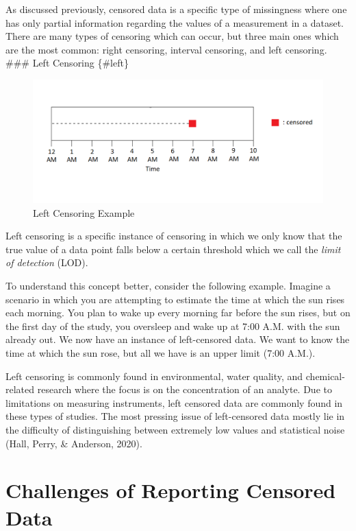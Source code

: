 \documentclass[12pt, twoside]{amherstthesis}
\begin{document}
As discussed previously, censored data is a specific type of missingness where one has only partial information regarding the values of a measurement in a dataset. There are many types of censoring which can occur, but three main ones which are the most common: right censoring, interval censoring, and left censoring.
\#\#\# Left Censoring \{\#left\}
\begin{figure}

{\centering \includegraphics[width=1\linewidth]{figures/left_censoring_example_fix} 

}

\caption{Left Censoring Example}\label{fig:leftcensoringexample}
\end{figure}
Left censoring is a specific instance of censoring in which we only know that the true value of a data point falls below a certain threshold which we call the \emph{limit of detection} (LOD).

To understand this concept better, consider the following example. Imagine a scenario in which you are attempting to estimate the time at which the sun rises each morning. You plan to wake up every morning far before the sun rises, but on the first day of the study, you oversleep and wake up at 7:00 A.M. with the sun already out. We now have an instance of left-censored data. We want to know the time at which the sun rose, but all we have is an upper limit (7:00 A.M.).

Left censoring is commonly found in environmental, water quality, and chemical-related research where the focus is on the concentration of an analyte. Due to limitations on measuring instruments, left censored data are commonly found in these types of studies. The most pressing issue of left-censored data mostly lie in the difficulty of distinguishing between extremely low values and statistical noise (Hall, Perry, \& Anderson, 2020).

\hypertarget{challenges}{%
\section{Challenges of Reporting Censored Data}\label{challenges}}
\end{document}

